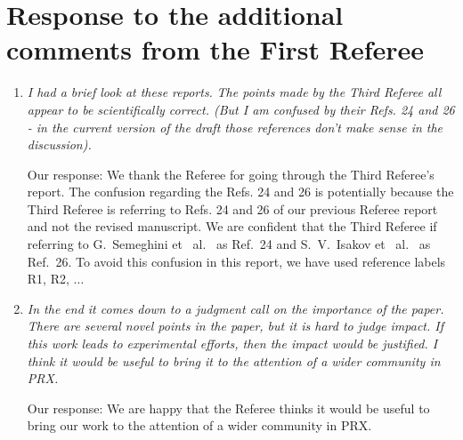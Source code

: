 \documentclass[
onecolumn,
superscriptaddress,
longbibliography,
nofootinbib,
 amsmath,amssymb,
 aps,
prb
]{revtex4-2}
\newcommand{\response}[1]{\textcolor{Mulberry}{#1}}
\begin{document}
\section{Response to the additional comments from the First Referee}
\begin{enumerate}
    \item \textit{I had a brief look at these reports.}
\textit{The points made by the Third Referee all appear to be scientifically
correct. (But I am confused by their Refs. 24 and 26 - in the current
version of the draft those references don’t make sense in the
discussion).}

\response{Our response: We thank the Referee for going through the Third Referee's report. The confusion regarding the Refs. 24 and 26 is potentially because the Third Referee is referring to Refs. 24 and 26 of our previous Referee report and not the revised manuscript. We are confident that the Third Referee if referring to G.~Semeghini et ~al.~\cite{semeghini2021} as Ref.~24 and S.~V.~Isakov et ~al.~\cite{isakov2005why} as Ref.~26. To avoid this confusion in this report, we have used reference labels R1, R2, $\ldots$}

\item \textit{In the end it comes down to a judgment call on the importance of the
paper. There are several novel points in the paper, but it is hard to
judge impact. If this work leads to experimental efforts, then the
impact would be justified. I think it would be useful to bring it to
the attention of a wider community in PRX.}

\response{Our response: We are happy that the Referee thinks it would be useful to bring our work to the attention of a wider community in PRX.}

\end{enumerate}





\noindent\makebox[\linewidth]{\rule{\textwidth}{0.4pt}}
\end{document}
